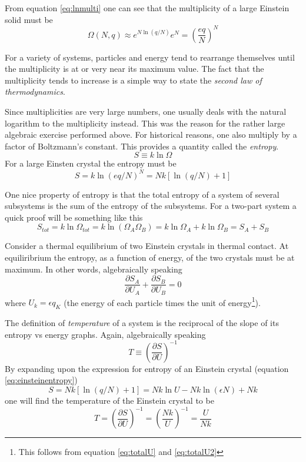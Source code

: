 \documentclass[10pt,a4paper]{amsart}
\begin{document}
From equation \ref{eq:lnmulti} one can see that the multiplicity of a large Einstein solid must be 
\begin{equation}
\label{eq:largemulti}
\Omega (N,q) \approx e^{N \ln (q/N)}e^N= \left(\frac{eq}{N}\right)^N
\end{equation}

For a variety of systems, particles and energy tend to rearrange themselves until the multiplicity is at or very near its maximum value. The fact that the multiplicity tends to increase is a simple way to state the \emph{second law of thermodynamics}.

Since multiplicities are very large numbers, one usually deals with the natural logarithm to the multiplicity instead. This was the reason for the rather large algebraic exercise performed above. For historical reasons, one also multiply by a factor of Boltzmann's constant. This provides a quantity called the \emph{entropy}.
\begin{equation}
\label{eq:entropy}
S \equiv k \ln \Omega
\end{equation} 
For a large Einsten crystal the entropy must be
\begin{equation}
\label{eq:einsteinentropy}
S=k \ln (eq/N)^N = Nk[\ln (q/N) + 1]
\end{equation}

One nice property of entropy is that the total entropy of a system of several subsystems is the sum of the entropy of the subsystems. For a two-part system a quick proof will be something like this
\begin{equation}
S_{tot}=k \ln \Omega_{tot} = k \ln (\Omega_A\Omega_B) = k \ln \Omega_A + k \ln \Omega_B = S_A + S_B
\end{equation}

Consider a thermal equilibrium of two Einstein crystals in thermal contact. At equiliribrium the entropy, as a function of energy, of the two crystals must be at maximum. In other words, algebraically speaking
\begin{equation}
\frac{\partial S_A}{\partial U_A} + \frac{\partial S_B}{\partial U_B} = 0
\end{equation}
where $U_k= \epsilon q_K$ (the energy of each particle times the unit of energy\footnote{This follows from equation \ref{eq:totalU} and \ref{eq:totalU2}}). 

The definition of \emph{temperature} of a system is the reciprocal of the slope of its entropy vs energy graphs. Again, algebraically speaking
\begin{equation}
T \equiv \left(\frac{\partial S}{\partial U} \right)^{-1}
\end{equation}
By expanding upon the expression for entropy of an Einstein crystal (equation \ref{eq:einsteinentropy})
\begin{equation}
S= Nk[\ln (q/N) + 1]
= Nk \ln U -Nk \ln (\epsilon N) + Nk
\end{equation}
one will find the temperature of the Einstein crystal to be
\begin{equation}
T = \left(\frac{\partial S}{\partial U} \right)^{-1}
= \left(\frac{Nk}{U} \right)^{-1} = \frac{U}{Nk} 
\end{equation}
\end{document}
